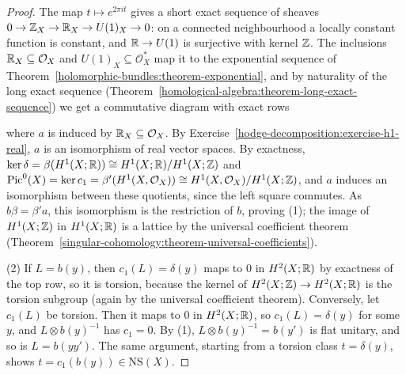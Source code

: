 \begin{proof}
The map $t \mapsto e^{2\pi it}$ gives a short exact sequence of sheaves $0 \to \mathbb{Z}_X \to \mathbb{R}_X \to U(1)_X \to 0$: on a connected neighbourhood a locally constant function is constant, and $\mathbb{R} \to U(1)$ is
surjective with kernel $\mathbb{Z}$. The inclusions $\mathbb{R}_X \subseteq \mathcal{O}_X$ and $U(1)_X \subseteq \mathcal{O}_X^*$ map it to the exponential sequence of
Theorem~\ref{holomorphic-bundles:theorem-exponential}, and by naturality of the long exact sequence (Theorem~\ref{homological-algebra:theorem-long-exact-sequence}) we get a commutative diagram with exact rows
\begin{center}
\end{center}
where $a$ is induced by $\mathbb{R}_X \subseteq \mathcal{O}_X$. By Exercise~\ref{hodge-decomposition:exercise-h1-real}, $a$ is an isomorphism of real vector spaces. By exactness,
$\ker\delta = \beta(H^1(X; \mathbb{R})) \cong H^1(X; \mathbb{R})/H^1(X; \mathbb{Z})$ and $\operatorname{Pic}^0(X) = \ker c_1 = \beta'(H^1(X, \mathcal{O}_X)) \cong H^1(X, \mathcal{O}_X)/H^1(X; \mathbb{Z})$, and $a$ induces an isomorphism between these
quotients, since the left square commutes. As $b\beta = \beta'a$, this isomorphism is the restriction of $b$, proving (1); the image of $H^1(X; \mathbb{Z})$ in $H^1(X; \mathbb{R})$ is a lattice by the universal coefficient
theorem (Theorem~\ref{singular-cohomology:theorem-universal-coefficients}).

(2) If $L = b(y)$, then $c_1(L) = \delta(y)$ maps to $0$ in $H^2(X; \mathbb{R})$ by exactness of the top row, so it is torsion, because the kernel of $H^2(X; \mathbb{Z}) \to H^2(X; \mathbb{R})$ is the torsion subgroup (again by
the universal coefficient theorem). Conversely, let $c_1(L)$ be torsion. Then it maps to $0$ in $H^2(X; \mathbb{R})$, so $c_1(L) = \delta(y)$ for some $y$, and $L \otimes b(y)^{-1}$ has $c_1 = 0$. By (1),
$L \otimes b(y)^{-1} = b(y')$ is flat unitary, and so is $L = b(yy')$. The same argument, starting from a torsion class $t = \delta(y)$, shows $t = c_1(b(y)) \in \mathrm{NS}(X)$.
\end{proof}

